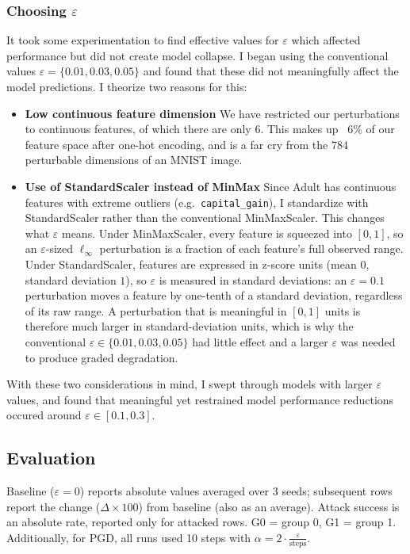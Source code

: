 \documentclass[11pt]{article}
\begin{document}
\subsubsection*{Choosing $\varepsilon$}
It took some experimentation to find effective values for $\varepsilon$ which affected performance but did not create model collapse. I began using the conventional values $\varepsilon = \{0.01, 0.03, 0.05\}$ and found that these did not meaningfully affect the model predictions. I theorize two reasons for this: 
\begin{itemize}
    \item \textbf{Low continuous feature dimension} \:\: We have restricted our perturbations to continuous features, of which there are only 6. This makes up ~$6\%$ of our feature space after one-hot encoding, and is a far cry from the 784 perturbable dimensions of an MNIST image.
    \item \textbf{Use of StandardScaler instead of MinMax} \:\: Since Adult has continuous features with extreme outliers (e.g.\ \texttt{capital\_gain}), I standardize with StandardScaler rather than the conventional MinMaxScaler. This changes what $\varepsilon$ means. Under MinMaxScaler, every feature is squeezed into $[0,1]$, so an $\varepsilon$-sized $\ell_\infty$ perturbation is a fraction of each feature's full observed range. Under StandardScaler, features are expressed in z-score units (mean $0$, standard deviation $1$), so $\varepsilon$ is measured in standard deviations: an $\varepsilon = 0.1$ perturbation moves a feature by one-tenth of a standard deviation, regardless of its raw range. A perturbation that is meaningful in $[0,1]$ units is therefore much larger in standard-deviation units, which is why the conventional $\varepsilon \in \{0.01, 0.03, 0.05\}$ had little effect and a larger $\varepsilon$ was needed to produce graded degradation. 
\end{itemize}
With these two considerations in mind, I swept through models with larger $\varepsilon$ values, and found that meaningful yet restrained model performance reductions occured around $\varepsilon \in [0.1, 0.3]$.


\subsection*{Evaluation}

Baseline ($\varepsilon = 0$) reports absolute values averaged over 3 seeds; subsequent rows report
the change ($\Delta \times 100$) from baseline (also as an average). Attack success is an absolute
rate, reported only for attacked rows. G0 = group 0, G1 = group 1. Additionally, for PGD, all runs used 10 steps with $\alpha = 2 \cdot \frac{\varepsilon}{\text{steps}}$.
\end{document}
